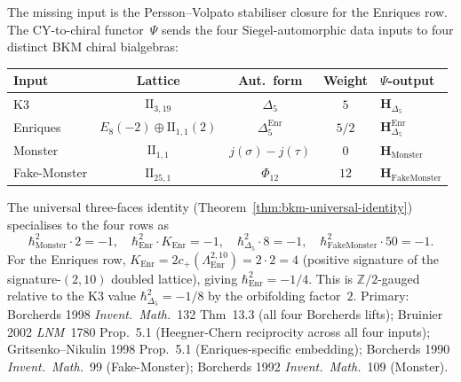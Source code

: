 \label{subsec:bkm-enriques-psi-landscape}

\begin{conjecture}
\label{thm:bkm-enriques-psi-landscape}
The missing input is the Persson--Volpato stabiliser closure for the
Enriques row.
The CY-to-chiral functor~$\Psi$ sends the four Siegel-automorphic
data inputs to four distinct BKM chiral bialgebras:
\begin{center}
\begin{tabular}{lcccl}
\toprule
Input & Lattice & Aut.\ form & Weight & $\Psi$-output \\
\midrule
K3 & $\mathrm{II}_{3,19}$ & $\Delta_5$ & $5$ &
 $\mathbf{H}_{\Delta_5}$ \\
Enriques & $E_8(-2)\oplus\mathrm{II}_{1,1}(2)$ & $\Delta_5^{\mathrm{Enr}}$ &
 $5/2$ & $\mathbf{H}_{\Delta_5}^{\mathrm{Enr}}$ \\
Monster & $\mathrm{II}_{1,1}$ & $j(\sigma) - j(\tau)$ & $0$ &
 $\mathbf{H}_{\mathrm{Monster}}$ \\
Fake-Monster & $\mathrm{II}_{25,1}$ & $\Phi_{12}$ & $12$ &
 $\mathbf{H}_{\mathrm{FakeMonster}}$ \\
\bottomrule
\end{tabular}
\end{center}
The universal three-faces identity
(Theorem~\ref{thm:bkm-universal-identity})
specialises to the four rows as
\[
 \hbar^2_{\mathrm{Monster}}\cdot 2 = -1,\quad
 \hbar^2_{\mathrm{Enr}}\cdot K_{\mathrm{Enr}} = -1,\quad
 \hbar^2_{\Delta_5}\cdot 8 = -1,\quad
 \hbar^2_{\mathrm{FakeMonster}}\cdot 50 = -1.
\]
For the Enriques row, $K_{\mathrm{Enr}} = 2c_+(\Lambda_{\mathrm{Enr}}^{2,10})
= 2\cdot 2 = 4$ (positive signature of the signature-$(2,10)$ doubled
lattice), giving $\hbar^2_{\mathrm{Enr}} = -1/4$. This is
$\mathbb{Z}/2$-gauged relative to the K3 value $\hbar^2_{\Delta_5} = -1/8$
by the orbifolding factor~$2$.
Primary: Borcherds 1998 \emph{Invent.~Math.}~132 Thm~13.3 (all four
Borcherds lifts); Bruinier 2002 \emph{LNM}~1780 Prop.~5.1
(Heegner-Chern reciprocity across all four inputs);
Gritsenko--Nikulin 1998 Prop.~5.1 (Enriques-specific embedding);
Borcherds 1990 \emph{Invent.~Math.}~99 (Fake-Monster); Borcherds 1992
\emph{Invent.~Math.}~109 (Monster).
\end{conjecture}

